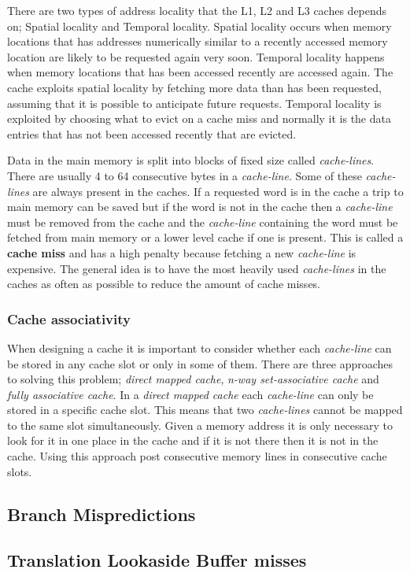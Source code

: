 There are two types of address locality that the L1, L2 and L3 caches depends on; Spatial locality and Temporal locality.
Spatial locality occurs when memory locations that has addresses numerically similar to a recently accessed memory location are likely to be requested again very soon.
Temporal locality happens when memory locations that has been accessed recently are accessed again.
The cache exploits spatial locality by fetching more data than has been requested, assuming that it is possible to anticipate future requests.
Temporal locality is exploited by choosing what to evict on a cache miss and normally it is the data entries that has not been accessed recently that are evicted.

Data in the main memory is split into blocks of fixed size called \textit{cache-lines}. 
There are usually 4 to 64 consecutive bytes in a \textit{cache-line}. 
Some of these \textit{cache-lines} are always present in the caches. 
If a requested word is in the cache a trip to main memory can be saved but if the word is not in the cache then a \textit{cache-line} must be removed from the cache and the \textit{cache-line} containing the word must be fetched from main memory or a lower level cache if one is present. 
This is called a \textbf{cache miss} and has a high penalty because fetching a new \textit{cache-line} is expensive.
The general idea is to have the most heavily used \textit{cache-lines} in the caches as often as possible to reduce the amount of cache misses.

\subsubsection{Cache associativity}
When designing a cache it is important to consider whether each \textit{cache-line} can be stored in any cache slot or only in some of them.
There are three approaches to solving this problem; \textit{direct mapped cache}, \textit{n-way set-associative cache} and \textit{fully associative cache}. 
In a \textit{direct mapped cache} each \textit{cache-line} can only be stored in a specific cache slot.
This means that two \textit{cache-lines} cannot be mapped to the same slot simultaneously.
Given a memory address it is only necessary to look for it in one place in the cache and if it is not there then it is not in the cache. Using this approach post consecutive memory lines in consecutive cache slots. 




\subsection{Branch Mispredictions}

\subsection{Translation Lookaside Buffer misses}
